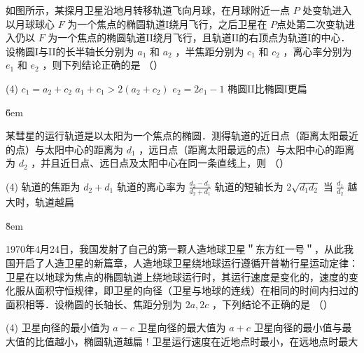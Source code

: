 \begin{example}
    如图所示，某探月卫星沿地月转移轨道飞向月球，在月球附近一点 $P$ 处变轨进入以月球球心 $F$ 为一个焦点的椭圆轨道I绕月飞行，之后卫星在 $P$点处第二次变轨进入仍以 $F$ 为一个焦点的椭圆轨道II绕月飞行，且轨道II的右顶点为轨道I的中心．设椭圆I与II的长半轴长分别为 $a_1$ 和 $a_2$ ，半焦距分别为 $c_1$ 和 $c_2$ ，离心率分别为 $e_1$ 和 $e_2$ ，则下列结论正确的是 （\qquad）
    \begin{figure} [H]
        \centering
        \resizebox{0.25\textwidth}{!}{}
    \end{figure}
    \begin{tasks}(4)
        \task $c_1=a_2+c_2$
        \task $a_1+c_1>2\left(a_2+c_2\right)$
        \task $e_2=2 e_1-1$
        \task 椭圆II比椭圆I更扁
    \end{tasks}
\end{example}

\v{6em}

\begin{example}
    某彗星的运行轨道是以太阳为一个焦点的椭圆．测得轨道的近日点（距离太阳最近的点）与太阳中心的距离为 $d_1$ ，远日点（距离太阳最远的点）与太阳中心的距离为 $d_2$ ，并且近日点、远日点及太阳中心在同一条直线上，则 （\qquad）
    \begin{tasks}(4)
        \task 轨道的焦距为 $d_2+d_1$
        \task 轨道的离心率为 $\frac{d_2-d_1}{d_2+d_1}$
        \task 轨道的短轴长为 $2 \sqrt{d_1 d_2}$
        \task 当 $\frac{d_1}{d_2}$ 越大时，轨道越扁
    \end{tasks}
\end{example}

\v{8em}

\begin{example}
    1970年4月24日，我国发射了自己的第一颗人造地球卫星＂东方红一号＂，从此我国开启了人造卫星的新篇章，人造地球卫星绕地球运行遵循开普勒行星运动定律：卫星在以地球为焦点的椭圆轨道上绕地球运行时，其运行速度是变化的，速度的变化服从面积守恒规律，即卫星的向径（卫星与地球的连线）在相同的时间内扫过的面积相等．设椭圆的长轴长、焦距分别为 $2 a, 2 c$ ，下列结论不正确的是 （\qquad）
    \begin{figure} [H]
        \centering
        \resizebox{0.22\textwidth}{!}{}
    \end{figure}


    \begin{tasks}(4)
        \task 卫星向径的最小值为 $a-c$
        \task 卫星向径的最大值为 $a+c$
        \task* 卫星向径的最小值与最大值的比值越小，椭圆轨道越扁
        \task! 卫星运行速度在近地点时最小，在远地点时最大
    \end{tasks}
\end{example}


